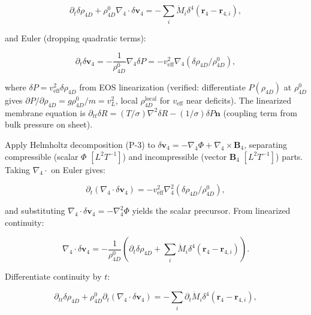 \begin{equation}
\partial_t \delta \rho_{4D} + \rho_{4D}^0 \nabla_4 \cdot \delta \mathbf{v}_4 = -\sum_i \dot{M}_i \delta^4(\mathbf{r}_4 - \mathbf{r}_{4,i}),
\end{equation}

and Euler (dropping quadratic terms):

\begin{equation}
\partial_t \delta \mathbf{v}_4 = -\frac{1}{\rho_{4D}^0} \nabla_4 \delta P = -v_{\text{eff}}^2 \nabla_4 (\delta \rho_{4D} / \rho_{4D}^0),
\end{equation}

where $\delta P = v_{\text{eff}}^2 \delta \rho_{4D}$ from EOS linearization (verified: differentiate $P(\rho_{4D})$ at $\rho_{4D}^0$ gives $\partial P / \partial \rho_{4D} = g \rho_{4D}^0 / m = v_L^2$, local $\rho_{4D}^{\text{local}}$ for $v_{\text{eff}}$ near deficits). The linearized membrane equation is $\partial_{tt} \delta R = (T / \sigma) \nabla^2 \delta R - (1/\sigma) \delta P \mathbf{n}$ (coupling term from bulk pressure on sheet).

Apply Helmholtz decomposition (P-3) to $\delta \mathbf{v}_4 = -\nabla_4 \Phi + \nabla_4 \times \mathbf{B}_4$, separating compressible (scalar $\Phi$ $[L^2 T^{-1}]$) and incompressible (vector $\mathbf{B}_4$ $[L^2 T^{-1}]$) parts. Taking $\nabla_4 \cdot$ on Euler gives:

\begin{equation}
\partial_t (\nabla_4 \cdot \delta \mathbf{v}_4) = -v_{\text{eff}}^2 \nabla_4^2 (\delta \rho_{4D} / \rho_{4D}^0),
\end{equation}

and substituting $\nabla_4 \cdot \delta \mathbf{v}_4 = -\nabla_4^2 \Phi$ yields the scalar precursor. From linearized continuity:

\begin{equation}
\nabla_4 \cdot \delta \mathbf{v}_4 = -\frac{1}{\rho_{4D}^0} \left( \partial_t \delta \rho_{4D} + \sum_i \dot{M}_i \delta^4(\mathbf{r}_4 - \mathbf{r}_{4,i}) \right).
\end{equation}

Differentiate continuity by $t$:

\begin{equation}
\partial_{tt} \delta \rho_{4D} + \rho_{4D}^0 \partial_t (\nabla_4 \cdot \delta \mathbf{v}_4) = -\sum_i \partial_t \dot{M}_i \delta^4(\mathbf{r}_4 - \mathbf{r}_{4,i}),
\end{equation}

